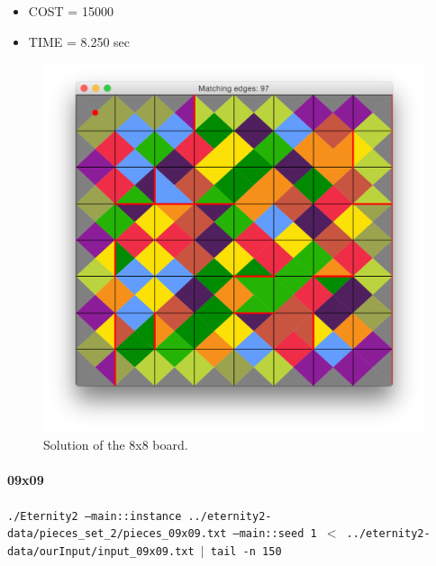 	\begin{itemize}
		\item COST = 15000
		\item TIME = 8.250 sec
	\end{itemize}
	\begin{figure}[H]
	\centering
	\includegraphics[scale=0.25]{img/sol_08x08}
	\caption{Solution of the 8x8 board.}
	\end{figure}



	\paragraph{09x09}
	\texttt{./Eternity2 --main::instance ../eternity2-data/pieces\_set\_2/pieces\_09x09.txt --main::seed 1 $<$ ../eternity2-data/ourInput/input\_09x09.txt $\mid$ tail -n 150 }

